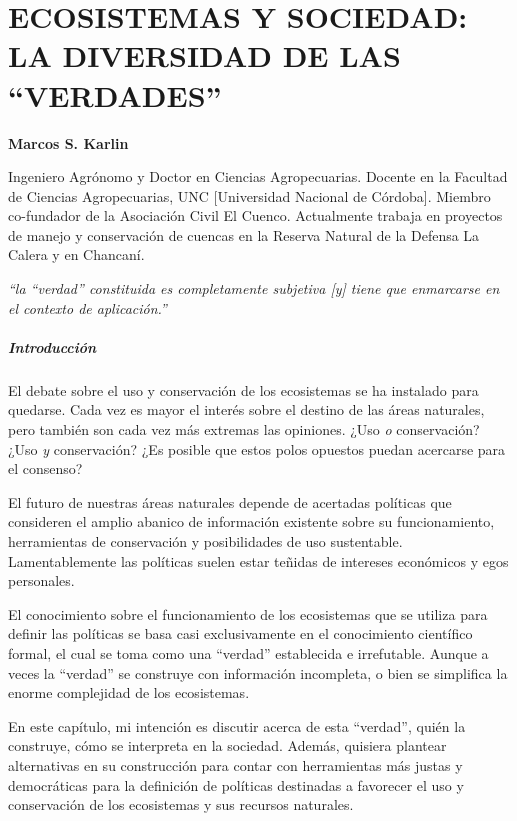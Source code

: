 \documentclass[
]{article}
\begin{document}
\cleardoublepage

\hypertarget{ecosistemas-y-sociedad-la-diversidad-de-las-verdades}{%
\section{ECOSISTEMAS Y SOCIEDAD: LA DIVERSIDAD DE LAS
``VERDADES''}\label{ecosistemas-y-sociedad-la-diversidad-de-las-verdades}}

\textbf{Marcos S. Karlin}

Ingeniero Agrónomo y Doctor en Ciencias Agropecuarias. Docente en la
Facultad de Ciencias Agropecuarias, UNC {[}Universidad Nacional de
Córdoba{]}. Miembro co-fundador de la Asociación Civil El Cuenco.
Actualmente trabaja en proyectos de manejo y conservación de cuencas en
la Reserva Natural de la Defensa La Calera y en Chancaní.

\emph{``la ``verdad'' constituida es completamente subjetiva {[}y{]}
tiene que enmarcarse en el contexto de aplicación.''}

\hypertarget{introducciuxf3n}{%
\subparagraph{Introducción}\label{introducciuxf3n}}

El debate sobre el uso y conservación de los ecosistemas se ha instalado
para quedarse. Cada vez es mayor el interés sobre el destino de las
áreas naturales, pero también son cada vez más extremas las opiniones.
¿Uso \emph{o} conservación? ¿Uso \emph{y} conservación? ¿Es posible que
estos polos opuestos puedan acercarse para el consenso?

El futuro de nuestras áreas naturales depende de acertadas políticas que
consideren el amplio abanico de información existente sobre su
funcionamiento, herramientas de conservación y posibilidades de uso
sustentable. Lamentablemente las políticas suelen estar teñidas de
intereses económicos y egos personales.

El conocimiento sobre el funcionamiento de los ecosistemas que se
utiliza para definir las políticas se basa casi exclusivamente en el
conocimiento científico formal, el cual se toma como una ``verdad''
establecida e irrefutable. Aunque a veces la ``verdad'' se construye con
información incompleta, o bien se simplifica la enorme complejidad de
los ecosistemas.

En este capítulo, mi intención es discutir acerca de esta ``verdad'',
quién la construye, cómo se interpreta en la sociedad. Además, quisiera
plantear alternativas en su construcción para contar con herramientas
más justas y democráticas para la definición de políticas destinadas a
favorecer el uso y conservación de los ecosistemas y sus recursos
naturales.
\end{document}
